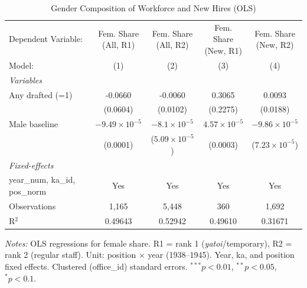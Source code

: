 \begin{table}[htbp]
\centering
\caption{Gender Composition of Workforce and New Hires (OLS)}
\label{tab:gender-share}
\small
\begin{threeparttable}
\begin{tabular}{lcccc}
   \toprule
   Dependent Variable: & \makecell{Fem. Share\\(All, R1)} & \makecell{Fem. Share\\(All, R2)} & \makecell{Fem. Share\\(New, R1)} & \makecell{Fem. Share\\(New, R2)} \\
   Model:              & (1) & (2) & (3) & (4) \\
   \midrule
   \emph{Variables}\\
   Any drafted (=1)     & -0.0660 & -0.0060 & 0.3065 & 0.0093 \\
                        & (0.0604) & (0.0102) & (0.2275) & (0.0188) \\
   Male baseline        & $-9.49\times 10^{-5}$ & $-8.1\times 10^{-5}$ & $4.57\times 10^{-5}$ & $-9.86\times 10^{-5}$ \\
                        & (0.0001) & ($5.09\times 10^{-5}$) & (0.0003) & ($7.23\times 10^{-5}$) \\
   \midrule
   \emph{Fixed-effects}\\
   year\_num, ka\_id, pos\_norm & Yes & Yes & Yes & Yes \\
   \midrule
   Observations         & 1,165 & 5,448 & 360 & 1,692 \\
   R$^2$                & 0.49643 & 0.52942 & 0.49610 & 0.31671 \\
   \bottomrule
\end{tabular}
\begin{tablenotes}[flushleft]
\footnotesize
\item \textit{Notes:} OLS regressions for female share. R1 = rank 1 (\emph{yatoi}/temporary), R2 = rank 2 (regular staff). Unit: position $\times$ year (1938--1945). Year, ka, and position fixed effects. Clustered (office\_id) standard errors. $^{***}p<0.01$, $^{**}p<0.05$, $^{*}p<0.1$.
\end{tablenotes}
\end{threeparttable}
\end{table}
